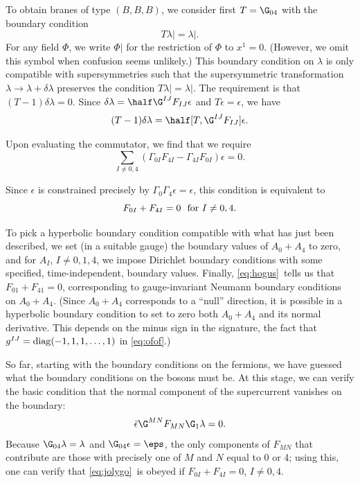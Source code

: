 To obtain branes of type $(B,B,B)$, we consider first $T=\G_{04}$
with the boundary condition %
\setcounter{equation}{8}
\begin{equation}\label{eq:unvu}
T\lambda\vert
=\lambda\vert.
\end{equation}
 For any field $\Phi$, we write $\Phi|$ for the
restriction of $\Phi$ to $x^1=0$. (However, we omit this symbol
when confusion seems unlikely.)  This boundary condition on
$\lambda$ is only compatible with supersymmetries such that the
supersymmetric transformation $\lambda\to \lambda+\delta\lambda$
preserves the condition $T\lambda\vert=\lambda\vert$.  The
requirement is that $(T-1)\delta\lambda=0$. Since
$\delta\lambda=\half\G^{IJ}F_{IJ}\epsilon$ and
$T\epsilon=\epsilon$, we have
\setcounter{equation}{9}
\begin{equation}\label{eq:bogus}
(T-1)\delta\lambda =\half [T,\G^{IJ}F_{IJ}]\epsilon.
\end{equation}

Upon evaluating the commutator, we find that we require
\setcounter{equation}{10}
\begin{equation}\label{eq:nogus}
\sum_{I\not=0,4}(\Gamma_{0I}F_{4I}-\Gamma_{4I}F_{0I})\epsilon=0.
\end{equation}

Since $\epsilon$ is constrained precisely by
$\Gamma_0\Gamma_4\epsilon=\epsilon$, this condition is equivalent
to %
\setcounter{equation}{11}
\begin{equation}\label{eq:hogus}
F_{0I}+F_{4I}=0~~{\rm for}~I\not=0,4.
\end{equation}

To pick a hyperbolic boundary condition compatible with what has
just been described, we set (in a suitable gauge) the boundary
values of $A_0+A_4$ to zero, and for $A_I$, $I\not= 0,1,4$, we
impose Dirichlet boundary conditions with some specified,
time-independent, boundary values.  Finally, \eqref{eq:hogus}\ tells us that
$F_{01}+F_{41}=0$, corresponding to gauge-invariant Neumann
boundary conditions on $A_0+A_4$. (Since $A_0+A_4$ corresponds to
a ``null'' direction, it is possible in a hyperbolic boundary
condition to set to zero both $A_0+A_4$ and its normal derivative.
This depends on the minus sign in the signature, the fact that
$g^{IJ}={\rm diag}(-1,1,1,\dots,1)$ in \eqref{eq:ofof}.)

So far, starting with the boundary conditions on the fermions, we
have guessed what the boundary conditions on the bosons must be.
At this stage, we can verify the basic condition that the normal
component of the supercurrent vanishes on the boundary:
\setcounter{equation}{12}
\begin{equation}\label{eq:jolygo}
{\bar\epsilon}\G^{MN}F_{MN}\G_1\lambda=0.
\end{equation}
 Because
$\G_{04}\lambda=\lambda$ and $\G_{04}\epsilon=\eps$, the only
components of $F_{MN}$ that contribute are those with precisely
one of $M$ and $N$ equal to 0 or 4; using this, one can verify
that \eqref{eq:jolygo}\ is obeyed if $F_{0I}+F_{4I}=0$, $I\not= 0,4$.

